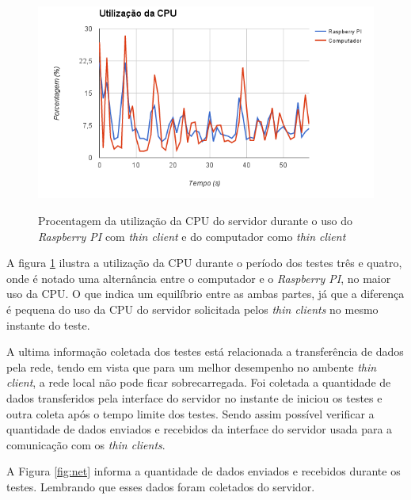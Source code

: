 \documentclass[
	12pt,				%
	openright,			%
	twoside,			%
	a4paper,			%
	chapter=TITLE,		%
	english,			%
	brazil				%
	]{abntex2}
\begin{document}
\begin{figure}[!htb]
\centering
\caption{Procentagem da utilização da CPU do servidor durante o uso do \textit{Raspberry PI} com \textit{thin client} e do computador como \textit{thin client}}
\includegraphics[scale=0.8]{Imagens/cpu_2}
\label{fig:cpu}
\end{figure}

A figura \ref{fig:cpu} ilustra a utilização da CPU durante o período dos testes três e quatro, onde é notado uma alternância entre o computador e o \textit{Raspberry PI}, no maior uso da CPU. O que indica um equilíbrio entre as ambas partes, já que a diferença é pequena do uso da CPU do servidor solicitada pelos \textit{thin clients}  no mesmo instante do teste.

A ultima informação coletada dos testes está relacionada a transferência de dados pela rede, tendo em vista que para um melhor desempenho no ambente \textit{thin client}, a rede local não pode ficar sobrecarregada. Foi coletada a quantidade de dados transferidos pela interface do servidor no instante de iniciou os testes e outra coleta após o tempo limite dos testes. Sendo assim possível verificar a quantidade de dados enviados e recebidos da interface do servidor usada para a comunicação com os \textit{thin clients}.

A Figura \ref{fig:net} informa a quantidade de dados enviados e recebidos durante os testes. Lembrando que esses dados foram coletados do servidor.
\end{document}
